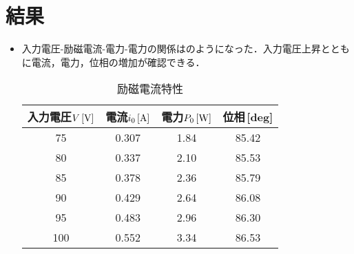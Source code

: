 \clearpage

\section{結果}
\begin{itemize}
	\item 入力電圧-励磁電流-電力-電力の関係はのようになった．入力電圧上昇とともに電流，電力，位相の増加が確認できる．
	\begin{table}[h]
	\centering
	\caption{励磁電流特性}
	\label{tab:re1}
	\begin{tabular}{cccc}
	\hline
	入力電圧$V\,[\rm{V}]$& 電流$i_{0}\,[\rm{A}]$& 電力$P_{0}\,[\rm{W}]$& 位相\,[\rm{deg}]  \\ 
	\hline
	75  & 0.307    & 1.84     & 85.42 \\
	80  & 0.337    & 2.10      & 85.53 \\
	85  & 0.378    & 2.36     & 85.79 \\
	90  & 0.429    & 2.64     & 86.08 \\
	95  & 0.483    & 2.96     & 86.30 \\
	100 & 0.552    & 3.34     & 86.53 \\ \hline
	\end{tabular}
	\end{table}
\end{itemize}